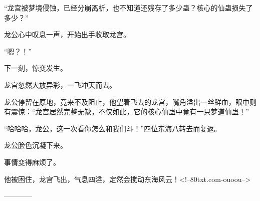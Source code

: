 \begin{this_body}
“龙宫被梦境侵蚀，已经分崩离析，也不知道还残存了多少蛊？核心的仙蛊损失了多少？”

龙公心中叹息一声，开始出手收取龙宫。

“嗯？！”

下一刻，惊变发生。

龙宫忽然大放异彩，一飞冲天而去。

龙公停留在原地，竟来不及阻止，他望着飞去的龙宫，嘴角溢出一丝鲜血，眼中则有震惊：“龙宫居然完整无缺，不仅如此，它的核心仙蛊中竟有一只梦道仙蛊！”

“哈哈哈，龙公，这一次看你怎么和我们斗！”四位东海八转去而复返。

龙公脸色沉凝下来。

事情变得麻烦了。

他被困住，龙宫飞出，气息四溢，定然会搅动东海风云！<!--80txt.com-ouoou-->

------------

\end{this_body}

